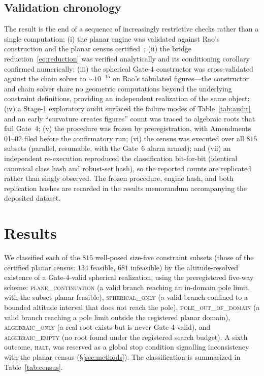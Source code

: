 \documentclass[pdflatex,sn-mathphys-num]{sn-jnl}
\theoremstyle{thmstyleone}%
\theoremstyle{thmstyletwo}%
\theoremstyle{thmstylethree}%
\begin{document}
\subsection{Validation chronology}
\label{sec:chronology}

The result is the end of a sequence of increasingly restrictive checks rather
than a single computation:
(i) the planar engine was validated against Rao's construction and the planar
census certified~\cite{plane-census};
(ii) the bridge reduction~\eqref{eq:reduction} was verified analytically and its conditioning corollary confirmed numerically;
(iii) the spherical Gate-4 constructor was cross-validated against the chain
solver to $\sim\!10^{-15}$ on Rao's tabulated figures---the constructor and chain solver share no geometric computations beyond the underlying constraint
definitions, providing an independent realization of the same object;
(iv) a Stage-1 exploratory audit surfaced the failure modes of
Table~\ref{tab:audit} and an early ``curvature creates figures'' count was traced to algebraic roots that fail Gate~4;
(v) the procedure was frozen by preregistration, with Amendments 01--02 filed
before the confirmatory run;
(vi) the census was executed over all $815$ subsets (parallel, resumable, with the Gate~6 alarm armed); and
(vii) an independent re-execution reproduced the classification bit-for-bit
(identical canonical class hash and robust-set hash), so the reported counts are replicated rather than singly observed. The frozen procedure, engine hash, and both replication hashes are recorded in the results memorandum accompanying the deposited dataset.

\section{Results}
\label{sec:results}

We classified each of the $815$ well-posed size-five constraint subsets
(those of the certified planar census: $134$ feasible, $681$ infeasible) by
the altitude-resolved existence of a Gate-4-valid spherical realization, using the preregistered five-way scheme: \textsc{plane\_continuation} (a valid branch reaching an in-domain pole limit, with the subset planar-feasible), \textsc{spherical\_only} (a valid branch confined to a bounded altitude interval that does not reach the pole), \textsc{pole\_out\_of\_domain} (a valid branch reaching a pole limit outside the registered planar domain), \textsc{algebraic\_only} (a real root exists but is never Gate-4-valid), and \textsc{algebraic\_empty} (no root found under the registered search budget). A sixth outcome, \textsc{halt}, was reserved as a global stop condition signalling inconsistency with the planar census (\S\ref{sec:methods}). The classification is
summarized in Table~\ref{tab:census}.
\end{document}
